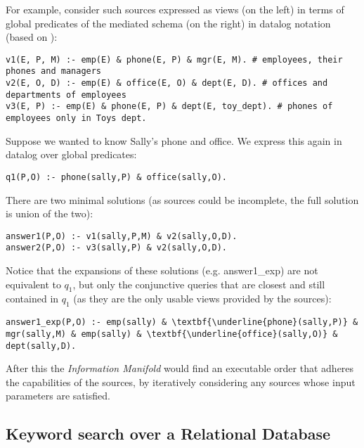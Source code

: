 For example, consider such sources expressed as views (on the left) in terms of global predicates of the mediated schema (on the right) in datalog notation (based on \cite{integr_views2000}):
%
{\small
\begin{verbatim}
v1(E, P, M) :- emp(E) & phone(E, P) & mgr(E, M). # employees, their phones and managers
v2(E, O, D) :- emp(E) & office(E, O) & dept(E, D). # offices and departments of employees
v3(E, P) :- emp(E) & phone(E, P) & dept(E, toy_dept). # phones of employees only in Toys dept.
\end{verbatim}
}
%
Suppose we wanted to know Sally's phone and office. We express this again in datalog over global predicates:
{\small\begin{verbatim}
q1(P,O) :- phone(sally,P) & office(sally,O).
\end{verbatim}}
There are two minimal solutions (as sources could be incomplete, the full solution is union of the two):
{\small
\begin{verbatim}
answer1(P,O) :- v1(sally,P,M) & v2(sally,O,D).
answer2(P,O) :- v3(sally,P) & v2(sally,O,D).
\end{verbatim}}
Notice that the expansions of these solutions (e.g. answer1\_exp) are not equivalent to $q_1$, but only the conjunctive queries that are closest and still contained in $q_1$ (as they are the only usable views provided by the sources):
{\footnotesize\begin{Verbatim}[commandchars=\\\{\}]
answer1_exp(P,O) :- emp(sally) & \textbf{\underline{phone}(sally,P)} & mgr(sally,M) & emp(sally) & \textbf{\underline{office}(sally,O)} & dept(sally,D).
\end{Verbatim}
}
After this the \textit{Information Manifold} would find an executable order that adheres the capabilities of the sources, by iteratively considering any sources whose input parameters are satisfied. 


\subsection{Keyword search over a Relational Database}

